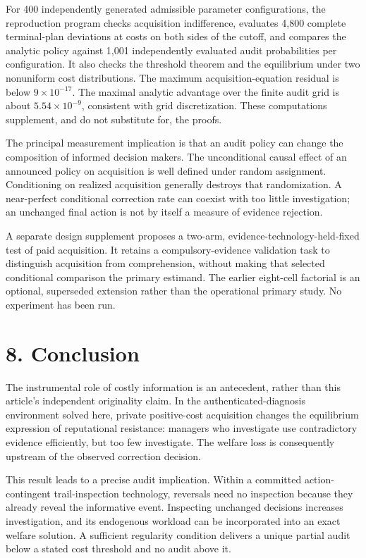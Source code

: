 \documentclass[
  11pt,
]{article}
\begin{document}
For 400 independently generated admissible parameter configurations, the
reproduction program checks acquisition indifference, evaluates 4,800
complete terminal-plan deviations at costs on both sides of the cutoff,
and compares the analytic policy against 1,001 independently evaluated
audit probabilities per configuration. It also checks the threshold
theorem and the equilibrium under two nonuniform cost distributions. The
maximum acquisition-equation residual is below \(9\times10^{-17}\). The
maximal analytic advantage over the finite audit grid is about
\(5.54\times10^{-9}\), consistent with grid discretization. These
computations supplement, and do not substitute for, the proofs.

The principal measurement implication is that an audit policy can change
the composition of informed decision makers. The unconditional causal
effect of an announced policy on acquisition is well defined under
random assignment. Conditioning on realized acquisition generally
destroys that randomization. A near-perfect conditional correction rate
can coexist with too little investigation; an unchanged final action is
not by itself a measure of evidence rejection.

A separate design supplement proposes a two-arm,
evidence-technology-held-fixed test of paid acquisition. It retains a
compulsory-evidence validation task to distinguish acquisition from
comprehension, without making that selected conditional comparison the
primary estimand. The earlier eight-cell factorial is an optional,
superseded extension rather than the operational primary study. No
experiment has been run.

\section{8. Conclusion}\label{conclusion}

The instrumental role of costly information is an antecedent, rather
than this article's independent originality claim. In the
authenticated-diagnosis environment solved here, private positive-cost
acquisition changes the equilibrium expression of reputational
resistance: managers who investigate use contradictory evidence
efficiently, but too few investigate. The welfare loss is consequently
upstream of the observed correction decision.

This result leads to a precise audit implication. Within a committed
action-contingent trail-inspection technology, reversals need no
inspection because they already reveal the informative event. Inspecting
unchanged decisions increases investigation, and its endogenous workload
can be incorporated into an exact welfare solution. A sufficient
regularity condition delivers a unique partial audit below a stated cost
threshold and no audit above it.
\end{document}
